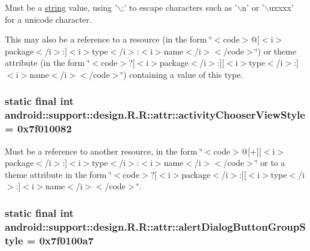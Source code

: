 Must be a \hyperlink{classandroid_1_1support_1_1design_1_1_r_1_1string}{string} value, using '$\backslash$;' to escape characters such as '$\backslash$n' or '$\backslash$uxxxx' for a unicode character. 

This may also be a reference to a resource (in the form \char`\"{}$<$code$>$@\mbox{[}$<$i$>$package$<$/i$>$:\mbox{]}$<$i$>$type$<$/i$>$:$<$i$>$name$<$/i$>$$<$/code$>$\char`\"{}) or theme attribute (in the form \char`\"{}$<$code$>$?\mbox{[}$<$i$>$package$<$/i$>$:\mbox{]}\mbox{[}$<$i$>$type$<$/i$>$:\mbox{]}$<$i$>$name$<$/i$>$$<$/code$>$\char`\"{}) containing a value of this type. \hypertarget{classandroid_1_1support_1_1design_1_1_r_1_1attr_709508c4ae58dc757de3ddef59574314}{
\subsubsection[{activityChooserViewStyle}]{\setlength{\rightskip}{0pt plus 5cm}static final int android::support::design.R.R::attr::activityChooserViewStyle = 0x7f010082}}
\label{classandroid_1_1support_1_1design_1_1_r_1_1attr_709508c4ae58dc757de3ddef59574314}


Must be a reference to another resource, in the form \char`\"{}$<$code$>$@\mbox{[}+\mbox{]}\mbox{[}$<$i$>$package$<$/i$>$:\mbox{]}$<$i$>$type$<$/i$>$:$<$i$>$name$<$/i$>$$<$/code$>$\char`\"{} or to a theme attribute in the form \char`\"{}$<$code$>$?\mbox{[}$<$i$>$package$<$/i$>$:\mbox{]}\mbox{[}$<$i$>$type$<$/i$>$:\mbox{]}$<$i$>$name$<$/i$>$$<$/code$>$\char`\"{}. \hypertarget{classandroid_1_1support_1_1design_1_1_r_1_1attr_d4a72a8b70b73c6ea89bd583d27c6e56}{
\subsubsection[{alertDialogButtonGroupStyle}]{\setlength{\rightskip}{0pt plus 5cm}static final int android::support::design.R.R::attr::alertDialogButtonGroupStyle = 0x7f0100a7}}
\label{classandroid_1_1support_1_1design_1_1_r_1_1attr_d4a72a8b70b73c6ea89bd583d27c6e56}



